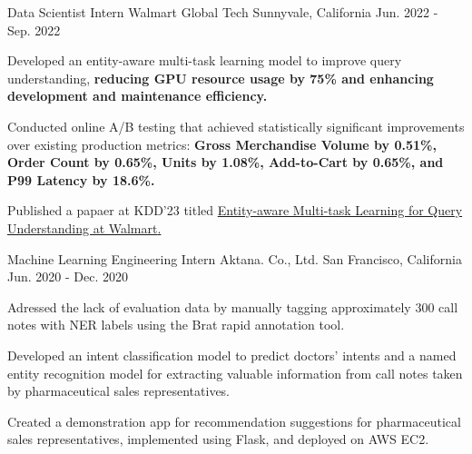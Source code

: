 

\begin{cventries}

  \cventry
    {Data Scientist Intern} %
    {Walmart Global Tech} %
    {Sunnyvale, California} %
    {Jun. 2022 - Sep. 2022} %
    {
      \begin{cvitems} %
        \item {Developed an entity-aware multi-task learning model to improve query understanding, \textbf{reducing GPU resource usage by 75\% and enhancing development and maintenance efficiency.}}
        \item {Conducted online A/B testing that achieved statistically significant improvements over existing production metrics: \textbf{Gross Merchandise Volume by 0.51\%, Order Count by 0.65\%, Units by 1.08\%, Add-to-Cart by 0.65\%, and P99 Latency by 18.6\%.}}
        \item Published a papaer at KDD'23 titled \href{https://dl.acm.org/doi/pdf/10.1145/3580305.3599816}{\textcolor{awesome-red}{Entity-aware Multi-task Learning for Query Understanding at Walmart}.}
      \end{cvitems}
    }
    
  \cventry
    {Machine Learning Engineering Intern} %
    {Aktana. Co., Ltd.} %
    {San Francisco, California} %
    {Jun. 2020 - Dec. 2020} %
    {
      \begin{cvitems} %
        \item {Adressed the lack of evaluation data by manually tagging approximately 300 call notes with NER labels using the Brat rapid annotation tool.}
        \item {Developed an intent classification model to predict doctors' intents and a named entity recognition model for extracting valuable information from call notes taken by pharmaceutical sales representatives.}
        \item {Created a demonstration app for recommendation suggestions for pharmaceutical sales representatives, implemented using Flask, and deployed on AWS EC2.}
      \end{cvitems}
    }

\end{cventries}
